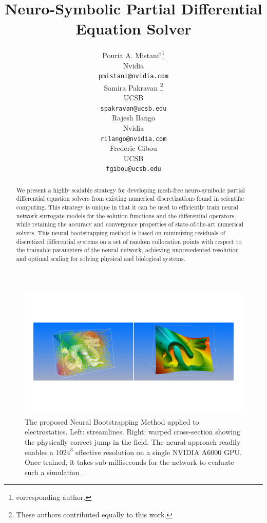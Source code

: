 \documentclass{article}
\title{Neuro-Symbolic Partial Differential Equation Solver}
\author{
  Pouria A. Mistani$^\dagger$\thanks{corresponding author.} \\
  Nvidia \\
  \texttt{pmistani@nvidia.com} \\
  \And
  Samira Pakravan \thanks{These authors contributed equally to this work.}\\
  UCSB \\
  \texttt{spakravan@ucsb.edu} \\
  \And
  Rajesh Ilango \\
  Nvidia \\
  \texttt{rilango@nvidia.com} \\
  \AND
  Frederic Gibou \\
  UCSB \\
  \texttt{fgibou@ucsb.edu} \\
}
\begin{document}
\maketitle

\vspace{-0.5cm}
\begin{figure}[h]
\centering
\includegraphics[width=0.99\linewidth]{figures/twoDragons.pdf}
\caption{The proposed Neural Bootstrapping Method applied to electrostatics. Left: streamlines. Right: warped cross-section showing the physically correct jump in the field. The neural approach readily enables a $1024^3$ effective resolution on a single NVIDIA A6000 GPU. Once trained, it takes sub-milliseconds for the network to evaluate such a simulation \cite{tiny-cuda-nn}.}
\label{fig:dragon}
\end{figure}

\begin{abstract}
 
  We present a highly scalable strategy for developing mesh-free neuro-symbolic partial differential equation solvers from existing numerical discretizations found in scientific computing. This strategy is unique in that it can be used to efficiently train neural network surrogate models for the solution functions and the differential operators, while retaining the accuracy and convergence properties of state-of-the-art numerical solvers. This neural bootstrapping method is based on minimizing residuals of discretized differential systems on a set of random collocation points with respect to the trainable parameters of the neural network, achieving unprecedented resolution and optimal scaling for solving physical and biological systems.
\end{abstract}

\end{document}
